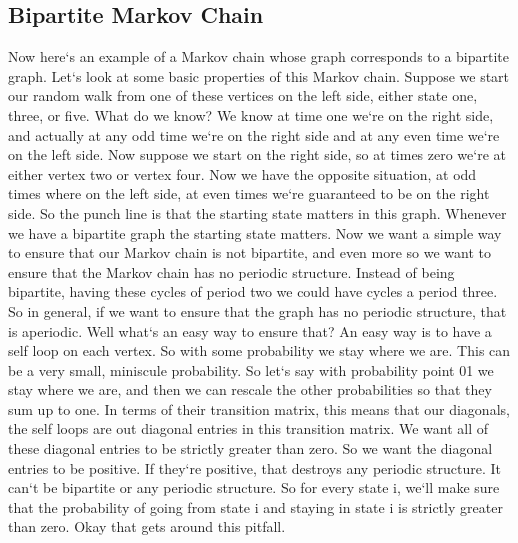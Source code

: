 \subsection{Bipartite Markov Chain}
Now here`s an example of a Markov chain whose graph corresponds to a bipartite graph.
Let`s look at some basic properties of this Markov chain.
Suppose we start our random walk from one of these vertices on the left side, either state one, three, or five.
What do we know? We know at time one we`re on the right side, and actually at any odd time we`re on the right side and at any even time we`re on the left side.
Now suppose we start on the right side, so at times zero we`re at either vertex two or vertex four.
Now we have the opposite situation, at odd times where on the left side, at even times we`re guaranteed to be on the right side.
So the punch line is that the starting state matters in this graph.
Whenever we have a bipartite graph the starting state matters.
Now we want a simple way to ensure that our Markov chain is not bipartite, and even more so we want to ensure that the Markov chain has no periodic structure.
Instead of being bipartite, having these cycles of period two we could have cycles a period three.
So in general, if we want to ensure that the graph has no periodic structure, that is aperiodic.
Well what`s an easy way to ensure that? An easy way is to have a self loop on each vertex.
So with some probability we stay where we are.
This can be a very small, miniscule probability.
So let`s say with probability point 01 we stay where we are, and then we can rescale the other probabilities so that they sum up to one.
In terms of their transition matrix, this means that our diagonals, the self loops are out diagonal entries in this transition matrix.
We want all of these diagonal entries to be strictly greater than zero.
So we want the diagonal entries to be positive.
If they`re positive, that destroys any periodic structure.
It can`t be bipartite or any periodic structure.
So for every state i, we`ll make sure that the probability of going from state i and staying in state i is strictly greater than zero.
Okay that gets around this pitfall.

